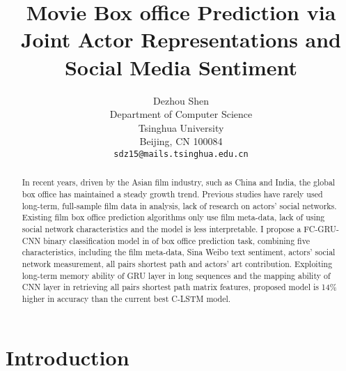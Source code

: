 \documentclass[review]{cvpr}
\begin{document}
\title{Movie Box office Prediction via Joint Actor Representations and Social Media Sentiment}

\author{Dezhou Shen\\
Department of Computer Science\\
Tsinghua University\\
Beijing, CN 100084\\
{\tt\small sdz15@mails.tsinghua.edu.cn}
}

\maketitle


\begin{abstract}
  In recent years, driven by the Asian film industry, such as China and India, the global box office has maintained a steady growth trend.
  Previous studies have rarely used long-term, full-sample film data in analysis, lack of research on actors' social networks.
  Existing film box office prediction algorithms only use film meta-data, lack of using social network characteristics and the model is less interpretable.
  I propose a FC-GRU-CNN binary classification model in of box office prediction task, combining five characteristics, including the film meta-data, Sina Weibo text sentiment,
  actors' social network measurement, all pairs shortest path and actors' art contribution.
  Exploiting long-term memory ability of GRU layer in long sequences and the mapping ability of CNN layer in retrieving all pairs shortest path matrix features,
  proposed model is 14\% higher in accuracy than the current best C-LSTM model.
\end{abstract}

\section{Introduction}
\end{document}
